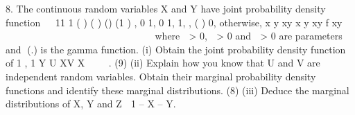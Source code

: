 
8. The continuous random variables X and Y have joint probability density function
 
11 1 ( ) ( ) () (1 ) , 0 1, 0 1, 1, , ( )
0, otherwise,
x y xy x y xy f xy
    

              


where  > 0,  > 0 and  > 0 are parameters and (.) is the gamma function.
(i) Obtain the joint probability density function of 1 , 1
Y U XV
X    .
(9)
(ii) Explain how you know that U and V are independent random variables. Obtain
their marginal probability density functions and identify these marginal
distributions.
(8)
(iii) Deduce the marginal distributions of X, Y and Z  1 – X – Y.
